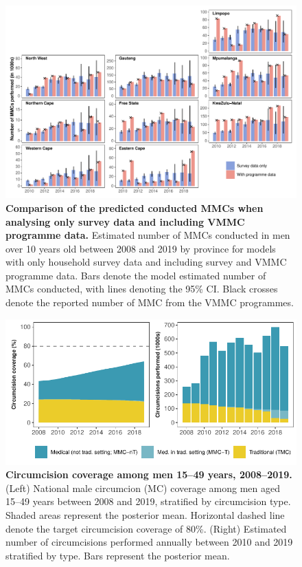 \documentclass{article}
\begin{document}
\begin{figure}[H]
  \centering
  \includegraphics[width = \linewidth]{Figures/paper/Figure2.pdf}
  \caption{{\bf Comparison of the predicted conducted MMCs when analysing only survey data and including VMMC programme data.} Estimated number of MMCs conducted in men over 10 years old between 2008 and 2019 by province for models with only household survey data and including survey and VMMC programme data. Bars denote the model estimated number of MMCs conducted, with lines denoting the 95\% CI. Black crosses denote the reported number of MMC from the VMMC programmes.}
  \label{fig::comparisonMMC}
\end{figure}


\begin{figure}[H]
  \centering
  \includegraphics[width = 5.2in]{Figures/paper/Figure3.pdf}
  \caption{{\bf Circumcision coverage among men 15--49 years, 2008--2019.}
    (Left) National male circumcion (MC) coverage among men aged 15--49 years between 2008 and 2019, stratified by circumcision type. Shaded areas represent the posterior mean. Horizontal dashed line denote the target circumcision coverage of 80\%. (Right) Estimated number of circumcisions performed annually between 2010 and 2019 stratified by type. Bars represent the posterior mean.}
  \label{fig::1549prev}
\end{figure}
\end{document}
